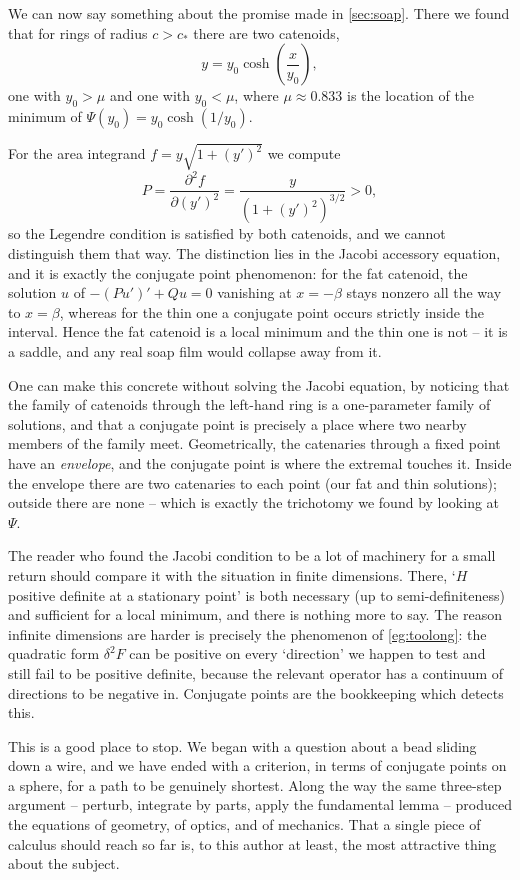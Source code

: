 \begin{example}
	We can now say something about the promise made in \autoref{sec:soap}. There we found that for rings of radius $c > c_*$ there are two catenoids,
	$$
	y = y_0 \cosh\left(\frac{x}{y_0}\right),
	$$
	one with $y_0 > \mu$ and one with $y_0 < \mu$, where $\mu \approx 0.833$ is the location of the minimum of $\Psi(y_0) = y_0\cosh(1/y_0)$.

	For the area integrand $f = y\sqrt{1 + (y')^2}$ we compute
	$$
	P = \frac{\partial^2 f}{\partial (y')^2} = \frac{y}{\left(1 + (y')^2\right)^{3/2}} > 0,
	$$
	so the Legendre condition is satisfied by both catenoids, and we cannot distinguish them that way. The distinction lies in the Jacobi accessory equation, and it is exactly the conjugate point phenomenon: for the fat catenoid, the solution $u$ of $-(Pu')' + Qu = 0$ vanishing at $x = -\beta$ stays nonzero all the way to $x = \beta$, whereas for the thin one a conjugate point occurs strictly inside the interval. Hence the fat catenoid is a local minimum and the thin one is not -- it is a saddle, and any real soap film would collapse away from it.

	One can make this concrete without solving the Jacobi equation, by noticing that the family of catenoids through the left-hand ring is a one-parameter family of solutions, and that a conjugate point is precisely a place where two nearby members of the family meet. Geometrically, the catenaries through a fixed point have an \emph{envelope}, and the conjugate point is where the extremal touches it. Inside the envelope there are two catenaries to each point (our fat and thin solutions); outside there are none -- which is exactly the trichotomy we found by looking at $\Psi$.
\end{example}

\begin{remark}
	The reader who found the Jacobi condition to be a lot of machinery for a small return should compare it with the situation in finite dimensions. There, `$H$ positive definite at a stationary point' is both necessary (up to semi-definiteness) and sufficient for a local minimum, and there is nothing more to say. The reason infinite dimensions are harder is precisely the phenomenon of \autoref{eg:toolong}: the quadratic form $\delta^2 F$ can be positive on every `direction' we happen to test and still fail to be positive definite, because the relevant operator has a continuum of directions to be negative in. Conjugate points are the bookkeeping which detects this.
\end{remark}

This is a good place to stop. We began with a question about a bead sliding down a wire, and we have ended with a criterion, in terms of conjugate points on a sphere, for a path to be genuinely shortest. Along the way the same three-step argument -- perturb, integrate by parts, apply the fundamental lemma -- produced the equations of geometry, of optics, and of mechanics. That a single piece of calculus should reach so far is, to this author at least, the most attractive thing about the subject.

